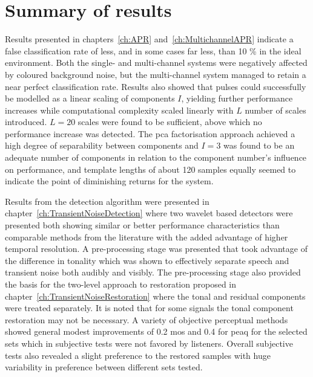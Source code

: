 \section{Summary of results}
Results presented in chapters~\ref{ch:APR} and~\ref{ch:MultichannelAPR} indicate a false classification rate of less, and in some cases far less, than 10 \% in the ideal environment. Both the single- and multi-channel systems were negatively affected by coloured background noise, but the multi-channel system managed to retain a near perfect classification rate. Results also showed that pulses could successfully be modelled as a linear scaling of components $I$, yielding further performance increases while computational complexity scaled linearly with $L$ number of scales introduced. $L=20$ scales were found to be sufficient, above which no performance increase was detected. The \gls{pca} factorisation approach achieved a high degree of separability between components and $I=3$ was found to be an adequate number of components in relation to the component number's influence on performance, and template lengths of about 120 samples equally seemed to indicate the point of diminishing returns for the system.

Results from the detection algorithm were presented in chapter~\ref{ch:TransientNoiseDetection} where two wavelet based detectors were presented both showing similar or better performance characteristics than comparable methods from the literature with the added advantage of higher temporal resolution. A pre-processing stage was presented that took advantage of the difference in tonality which was shown to effectively separate speech and transient noise both audibly and visibly. The pre-processing stage also provided the basis for the two-level approach to restoration proposed in chapter~\ref{ch:TransientNoiseRestoration} where the tonal and residual components were treated separately. It is noted that for some signals the tonal component restoration may not be necessary. A variety of objective perceptual methods showed general modest improvements of 0.2 \gls{mos} and 0.4 for \gls{peaq} for the selected sets which in subjective tests were not favored by listeners. Overall subjective tests also revealed a slight preference to the restored samples with huge variability in preference between different sets tested.

